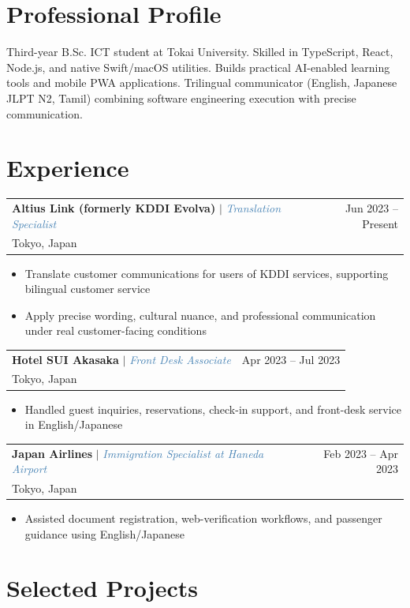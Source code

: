 \documentclass[9.5pt, a4paper]{article}
\makeatletter
\newcommand{\expheading}[4]{%
  \vspace{1.5pt}
  \begin{tabularx}{\linewidth}{@{}Xr@{}}
    \small\textbf{\color{darkgray}#1} $|$ \small\textcolor{steelblue}{\textit{#2}} & \textcolor{medgray}{\small #4}\\
    \textcolor{medgray}{\small #3} & \\
  \end{tabularx}
  \vspace{-1.5pt}
}
\newenvironment{bulletlist}{%
  \begin{itemize}[leftmargin=1.1em, itemsep=0.2pt, topsep=0.5pt, parsep=0pt]
  \small\color{darkgray}
}{%
  \end{itemize}\vspace{1.5pt}
}
\makeatother
\begin{document}
\begin{minipage}[t]{0.69\linewidth}
\vspace{0pt}

\section{Professional Profile}
{\small\color{darkgray}
Third-year B.Sc. ICT student at Tokai University. Skilled in TypeScript, React, Node.js, and native Swift/macOS utilities. Builds practical AI-enabled learning tools and mobile PWA applications. Trilingual communicator (English, Japanese JLPT N2, Tamil) combining software engineering execution with precise communication.
}

\section{Experience}

\expheading{Altius Link (formerly KDDI Evolva)}{Translation Specialist}{Tokyo, Japan}{Jun 2023 -- Present}
\begin{bulletlist}
  \item Translate customer communications for users of KDDI services, supporting bilingual customer service
  \item Apply precise wording, cultural nuance, and professional communication under real customer-facing conditions
\end{bulletlist}

\expheading{Hotel SUI Akasaka}{Front Desk Associate}{Tokyo, Japan}{Apr 2023 -- Jul 2023}
\begin{bulletlist}
  \item Handled guest inquiries, reservations, check-in support, and front-desk service in English/Japanese
\end{bulletlist}

\expheading{Japan Airlines}{Immigration Specialist at Haneda Airport}{Tokyo, Japan}{Feb 2023 -- Apr 2023}
\begin{bulletlist}
  \item Assisted document registration, web-verification workflows, and passenger guidance using English/Japanese
\end{bulletlist}

\section{Selected Projects}


\end{minipage}
\end{document}
